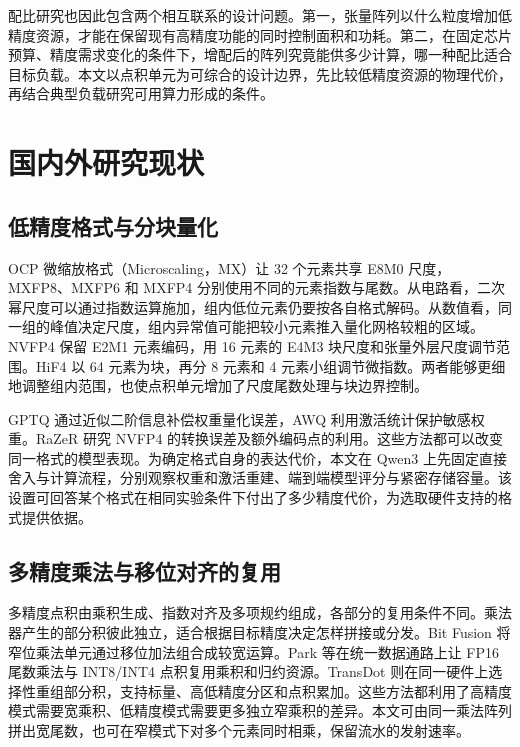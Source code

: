 \documentclass[10.5pt,compsoc,UTF8]{CjC}
\begin{document}
配比研究也因此包含两个相互联系的设计问题。第一，张量阵列以什么粒度增加低精度资源，才能在保留现有高精度功能的同时控制面积和功耗。第二，在固定芯片预算、精度需求变化的条件下，增配后的阵列究竟能供多少计算，哪一种配比适合目标负载。本文以点积单元为可综合的设计边界，先比较低精度资源的物理代价，再结合典型负载研究可用算力形成的条件。

\section{国内外研究现状}

\subsection{低精度格式与分块量化}

OCP 微缩放格式（Microscaling，MX）让 32 个元素共享 E8M0 尺度，MXFP8、MXFP6 和 MXFP4 分别使用不同的元素指数与尾数\cite{ocpmx2023,microscaling2023}。从电路看，二次幂尺度可以通过指数运算施加，组内低位元素仍要按各自格式解码。从数值看，同一组的峰值决定尺度，组内异常值可能把较小元素推入量化网格较粗的区域。NVFP4 保留 E2M1 元素编码，用 16 元素的 E4M3 块尺度和张量外层尺度调节范围\cite{nvidia2025nvfp4}。HiF4 以 64 元素为块，再分 8 元素和 4 元素小组调节微指数\cite{hifloat4}。两者能够更细地调整组内范围，也使点积单元增加了尺度尾数处理与块边界控制。

GPTQ 通过近似二阶信息补偿权重量化误差，AWQ 利用激活统计保护敏感权重\cite{gptq,awq}。RaZeR 研究 NVFP4 的转换误差及额外编码点的利用\cite{razer}。这些方法都可以改变同一格式的模型表现。为确定格式自身的表达代价，本文在 Qwen3 上先固定直接舍入与计算流程，分别观察权重和激活重建、端到端模型评分与紧密存储容量。该设置可回答某个格式在相同实验条件下付出了多少精度代价，为选取硬件支持的格式提供依据。

\subsection{多精度乘法与移位对齐的复用}

多精度点积由乘积生成、指数对齐及多项规约组成，各部分的复用条件不同。乘法器产生的部分积彼此独立，适合根据目标精度决定怎样拼接或分发。Bit Fusion 将窄位乘法单元通过移位加法组合成较宽运算\cite{bitfusion2018}。Park 等在统一数据通路上让 FP16 尾数乘法与 INT8/INT4 点积复用乘积和归约资源\cite{park2022unified}。TransDot 则在同一硬件上选择性重组部分积，支持标量、高低精度分区和点积累加\cite{transdot2026}。这些方法都利用了高精度模式需要宽乘积、低精度模式需要更多独立窄乘积的差异。本文可由同一乘法阵列拼出宽尾数，也可在窄模式下对多个元素同时相乘，保留流水的发射速率。
\end{document}
